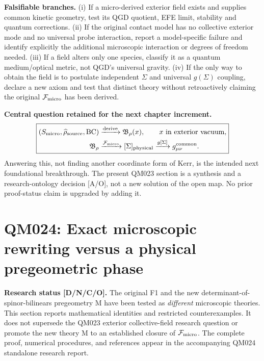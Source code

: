 \documentclass[11pt,a4paper]{article}
\begin{document}
\textbf{Falsifiable branches.} (i) If a micro-derived exterior field exists and supplies common kinetic geometry, test its QGD quotient, EFE limit, stability and quantum corrections. (ii) If the original contact model has no collective exterior mode and no universal probe interaction, report a model-specific failure and identify explicitly the additional microscopic interaction or degrees of freedom needed. (iii) If a field alters only one species, classify it as a quantum medium/optical metric, not QGD's universal gravity. (iv) If the only way to obtain the field is to postulate independent $\Sigma$ and universal $g(\Sigma)$ coupling, declare a new axiom and test that distinct theory without retroactively claiming the original $\mathcal F_{\rm micro}$ has been derived.

\textbf{Central question retained for the next chapter increment.}
\begin{equation}\label{eq:v13-question-final}
\boxed{\begin{aligned}
(S_{\rm micro},\widehat\rho_{\rm source},\mathrm{BC})
&\xrightarrow{\rm derive}\mathfrak B_{\rho}(x),\qquad x\text{ in exterior vacuum},\\
\mathfrak B_{\rho}&\xrightarrow{\mathcal F_{\rm micro}}[\Sigma]_{\rm physical}
\xrightarrow{g[\Sigma]}g_{\mu\nu}^{\rm common}.
\end{aligned}}
\end{equation}
Answering this, not finding another coordinate form of Kerr, is the intended next foundational breakthrough. The present QM023 section is a synthesis and a research-ontology decision [A/O], not a new solution of the open map. No prior proof-status claim is upgraded by adding it.

\clearpage
\section{QM024: Exact microscopic rewriting versus a physical pregeometric phase}
\label{sec:v14-qm024}
\textbf{Research status [D/N/C/O].} The original F1 and the new determinant-of-spinor-bilinears pregeometry M have been tested as \emph{different} microscopic theories. This section reports mathematical identities and restricted counterexamples. It does not supersede the QM023 exterior collective-field research question or promote the new theory M to an established closure of $\mathcal F_{\rm micro}$. The complete proof, numerical procedures, and references appear in the accompanying QM024 standalone research report.
\end{document}
